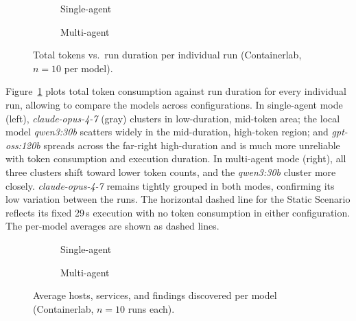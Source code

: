 \begin{figure}[H]
    \centering
    \begin{subfigure}[b]{0.48\linewidth}
        
        \caption{Single-agent}
    \end{subfigure}
    \hfill
    \begin{subfigure}[b]{0.48\linewidth}
        
        \caption{Multi-agent}
    \end{subfigure}
    \caption{Total tokens vs.\ run duration per individual run (Containerlab, $n=10$ per model).}
    \label{fig:benchmark_scatter_containerlab}
\end{figure}

Figure~\ref{fig:benchmark_scatter_containerlab} plots total token consumption against run
duration for every individual run, allowing to compare the models across configurations.
In single-agent mode (left), \textit{claude-opus-4-7} (gray) clusters in low-duration,
mid-token area; the local model \textit{qwen3:30b} scatters widely in the mid-duration, high-token region;
and \textit{gpt-oss:120b} spreads across the far-right high-duration and is much more unreliable with token consumption and execution duration.
In multi-agent mode (right), all three clusters shift toward lower token counts, and the
\textit{qwen3:30b} cluster more closely.
\textit{claude-opus-4-7} remains tightly grouped in both modes, confirming its low variation between the runs.
The horizontal dashed line for the Static Scenario reflects its fixed 29\,s execution with
no token consumption in either configuration.
The per-model averages are shown as dashed lines.

\begin{figure}[H]
    \centering
    \begin{subfigure}[b]{0.48\linewidth}
        
        \caption{Single-agent}
    \end{subfigure}
    \hfill
    \begin{subfigure}[b]{0.48\linewidth}
        
        \caption{Multi-agent}
    \end{subfigure}
    \caption{Average hosts, services, and findings discovered per model (Containerlab, $n=10$ runs each).}
    \label{fig:benchmark_services_containerlab}
\end{figure}

